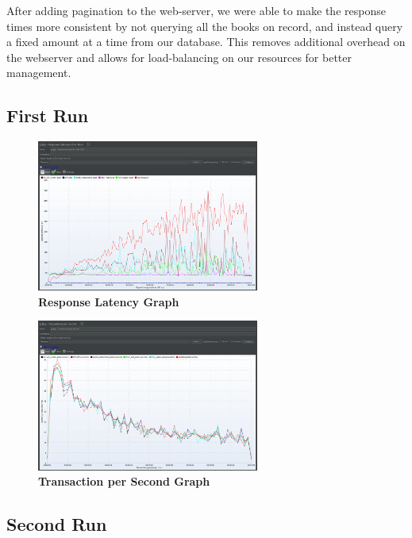 \documentclass[a4paper, 12pt]{article}
\begin{document}
\par After adding pagination to the web-server, we were able to make the response times more consistent
by not querying all the books on record, and instead query a fixed amount at a time from our database.
This removes additional overhead on the webserver and allows for load-balancing on our resources for better
management.

\subsection{First Run}

\begin{figure}[H]
    \centering
    \includegraphics[width=0.65\textwidth]{../perfRuns/secondRunRespLatency.png}
    \caption{\textbf{Response Latency Graph}}
\end{figure}

\begin{figure}[H]
    \centering
    \includegraphics[width=0.65\textwidth]{../perfRuns/secondRun.png}
    \caption{\textbf{Transaction per Second Graph}}
\end{figure}

\subsection{Second Run}
\end{document}
